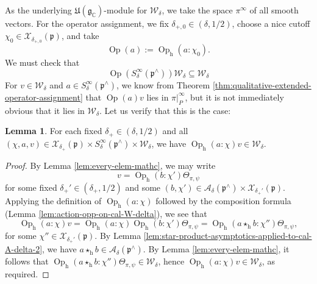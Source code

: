 \documentclass[reqno]{amsart}
\DeclareMathOperator{\h}{h}
\DeclareMathOperator{\Opp}{Op}
\theoremstyle{plain} \newtheorem{theorem} {Theorem}
\theoremstyle{definition} \newtheorem{definition} [theorem] {Definition}
\theoremstyle{itplain} %
\newtheorem{lemma}[theorem]{Lemma}
\numberwithin{equation}{section}
\numberwithin{theorem}{section}
\begin{document}
As the underlying $\mathfrak{U}(\mathfrak{g}_\mathbb{C})$-module for $\mathcal{W}_\delta$, we take the space $\pi^\infty$ of all smooth vectors.  For the operator assignment, we fix $\delta_{+,0} \in (\delta,1/2)$, choose a nice cutoff $\chi_0 \in \mathcal{X}_{\delta_{+,0}}(\mathfrak{p})$, and take
\begin{equation*}
\Opp(a) := \Opp_{\h}(a:\chi_0).
\end{equation*}
 We must check that
\begin{equation*}
  \Opp( S^\infty_\delta(\mathfrak{p}^\wedge)) \mathcal{W}_\delta \subseteq \mathcal{W}_\delta
\end{equation*}
For $v \in \mathcal{W}_\delta$ and $a \in S^\infty_\delta(\mathfrak{p}^\wedge)$, we know from Theorem \ref{thm:qualitative-extended-operator-assignment} that $\Opp(a) v$ lies in $\pi|_P^\infty$, but it is not immediately obvious that it lies in $\mathcal{W}_\delta$.  Let us verify that this is the case:
\begin{lemma}\label{lem:each-a-v}
  For each fixed $\delta_+ \in (\delta, 1/2)$ and all $(\chi,a,v) \in \mathcal{X}_{\delta_+}(\mathfrak{p}) \times S_\delta^\infty(\mathfrak{p}^\wedge) \times \mathcal{W}_\delta$, we have $\Opp_{\h}(a:\chi) v \in \mathcal{W}_\delta$.
\end{lemma}
\begin{proof}
  By Lemma \ref{lem:every-elem-mathc}, we may write
  \begin{equation}\label{eq:v-=-opp_hb:chi}
    v = \Opp_{\h}(b:\chi') \Theta_{\pi,\psi}
  \end{equation}
  for some fixed $\delta_+' \in (\delta_{+},1/2)$ and some $(b,\chi') \in \mathcal{A}_\delta(\mathfrak{p}^\wedge) \times \mathcal{X}_{\delta_+'}(\mathfrak{p})$.  Applying the definition of $\Opp_{\h}(a:\chi)$ followed by the composition formula (Lemma \ref{lem:action-opp-on-cal-W-delta}), we see that
  \begin{equation}\label{eq:oppa-v-Theta-stuff}
    \Opp_{\h}(a:\chi) v
    = \Opp_{\h}(a:\chi) \Opp_{\h}(b:\chi') \Theta_{\pi,\psi}
    = \Opp_{\h}(a \star_{\h} b:\chi'') \Theta_{\pi,\psi},
  \end{equation}
  for some $\chi'' \in \mathcal{X}_{\delta_+'}(\mathfrak{p})$.  By Lemma \ref{lem:star-product-asymptotics-applied-to-cal-A-delta-2}, we have $a \star_{\h} b \in \mathcal{A}_\delta(\mathfrak{p}^\wedge)$.
  By Lemma \ref{lem:every-elem-mathc}, it follows that $\Opp_{\h}(a \star_{\h} b:\chi'') \Theta_{\pi,\psi} \in \mathcal{W}_\delta$, hence $\Opp_{\h}(a:\chi) v \in \mathcal{W}_\delta$, as required.
\end{proof}
\end{document}
